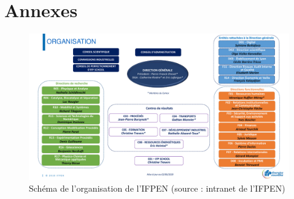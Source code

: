 \documentclass[12pt,a4paper,draft]{report}
\begin{document}
\section{Annexes}

\begin{center}
\begin{figure}[htbp]
\includegraphics[scale=0.6, angle=90]{vf-schema-organisation-ifpen-marguerite.pdf}
\caption{Schéma de l'organisation de l'IFPEN (source : intranet de l'IFPEN)}
\label{ifpen_org}
\end{figure}
\end{center}
\clearpage

\nocite{*}


\label{biblio}
\end{document}
